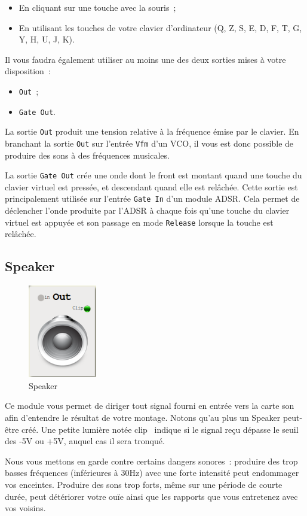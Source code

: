 \documentclass[a4paper,oneside,frenchb,10pt]{article}
\begin{document}
\begin{itemize}
\item
  En cliquant sur une touche avec la souris~;
\item
  En utilisant les touches de votre clavier d'ordinateur (Q, Z, S, E, D,
  F, T, G, Y, H, U, J, K).
\end{itemize}
Il vous faudra également utiliser au moins une des deux sorties mises à
votre disposition~:

\begin{itemize}
\item
  \verb!Out!~;
\item
  \verb!Gate Out!.
\end{itemize}
La sortie \verb!Out! produit une tension relative à la fréquence émise
par le clavier. En branchant la sortie \verb!Out! sur l'entrée
\verb!Vfm! d'un VCO, il vous est donc possible de produire des sons à
des fréquences musicales.

La sortie \verb!Gate Out! crée une onde dont le front est montant quand
une touche du clavier virtuel est pressée, et descendant quand elle est
relâchée. Cette sortie est principalement utilisée sur l'entrée
\verb!Gate In! d'un module ADSR. Cela permet de déclencher l'onde
produite par l'ADSR à chaque fois qu'une touche du clavier virtuel est
appuyée et son passage en mode \verb!Release! lorsque la touche est
relâchée.

\subsection{Speaker}

\begin{multicols}{2}
\begin{figure}[H]
\centering
\includegraphics[width=3cm]{../img/png/speaker.png}
\caption{Speaker}
\end{figure}

Ce module vous permet de diriger tout signal fourni en entrée vers la
carte son afin d'entendre le résultat de votre montage. Notons qu'au plus
un Speaker peut-être créé. Une petite lumière notée \guillemotleft clip\guillemotright~
indique si le signal reçu dépasse le seuil des -5V ou +5V, auquel cas il 
sera tronqué.

Nous vous mettons en garde contre certains dangers sonores~: produire
des trop basses fréquences (inférieures à 30Hz) avec une forte intensité
peut endommager vos enceintes. Produire des sons trop forts, même sur
une période de courte durée, peut détériorer votre ouïe ainsi que les
rapports que vous entretenez avec vos voisins.
\end{multicols}
\end{document}
